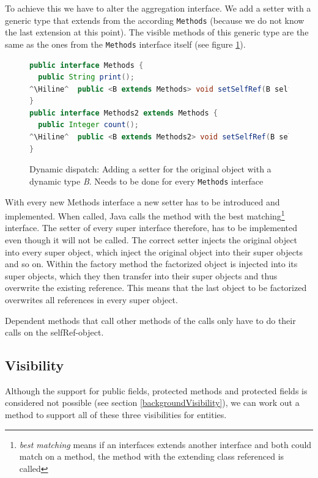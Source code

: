 \documentclass{report}
\newcommand{\Hiline}{\makebox[0pt][l]{\color[rgb]{1,0.96,0.98}\rule[-4pt]{\linewidth}{12.5pt}}}
\begin{document}
To achieve this we have to alter the aggregation interface. We add a setter with a generic type that extends from the according \lstinline{Methods} (because we do not know the last extension at this point). The visible methods of this generic type are the same as the ones from the \lstinline{Methods} interface itself (see figure \ref{dynamicDispatchMethods}).

\begin{figure}[H]
\begin{lstlisting}[language=java]
public interface Methods {
  public String print();
^\Hiline^  public <B extends Methods> void setSelfRef(B selfRef);
}
public interface Methods2 extends Methods {
  public Integer count();
^\Hiline^  public <B extends Methods2> void setSelfRef(B selfRef);
}
\end{lstlisting}
\caption{Dynamic dispatch: Adding a setter for the original object with a dynamic type \emph{B}. Needs to be done for every \lstinline{Methods} interface}
\label{dynamicDispatchMethods}
\end{figure}

With every new Methods interface a new setter has to be introduced and implemented. When called, Java calls the method with the best matching\footnote{\emph{best matching} means if an interfaces extends another interface and both could match on a method, the method with the extending class referenced is called} interface. The setter of every super interface therefore, has to be implemented even though it will not be called. The correct setter injects the original object into every super object, which inject the original object into their super objects and so on. Within the factory method the factorized object is injected into its super objects, which they then transfer into their super objects and thus overwrite the existing reference. This means that the last object to be factorized overwrites all references in every super object.

Dependent methods that call other methods of the calls only have to do their calls on the selfRef-object.

\subsection{Visibility}

Although the support for public fields, protected methods and protected fields is considered not possible (see section \ref{backgroundVisibility}), we can work out a method to support all of these three visibilities for entities.
\end{document}
